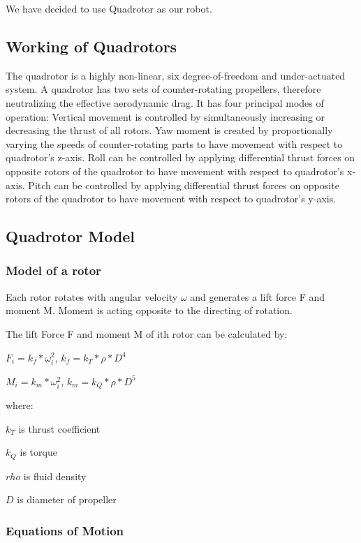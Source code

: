 
We have decided to use Quadrotor as our robot.

\subsection{Working of Quadrotors}

The quadrotor is a highly non-linear, six degree-of-freedom and under-actuated system. A quadrotor has two sets of counter-rotating propellers, therefore neutralizing the effective aerodynamic drag. It has four principal modes of operation: 
Vertical movement is controlled by simultaneously increasing or decreasing the thrust of all rotors. Yaw moment is created by proportionally varying the speeds of counter-rotating parts to have movement with respect to quadrotor's z-axis. Roll can be controlled by applying differential thrust forces on opposite rotors of the quadrotor to have movement with respect to quadrotor's x-axis. Pitch can be controlled by applying differential thrust forces on opposite rotors of the quadrotor to have movement with respect to quadrotor's y-axis.

\subsection{Quadrotor Model}

\subsubsection{Model of a rotor}

Each rotor rotates with angular velocity $\omega$ and generates a lift force F and moment M. Moment is acting opposite to the directing of rotation.

The lift Force F and moment M of ith rotor can be calculated by:

$F_i = k_f * \omega_i^2$, \hspace{1cm} $k_f = k_T*\rho * D^4$

$M_i = k_m * \omega_i^2$, \hspace{1cm} $k_m = k_Q*\rho * D^5$

where:

$k_T$ is thrust coefficient

$k_Q$ is torque 

$rho$ is fluid density

$D$ is diameter of propeller

\subsubsection{Equations of Motion}

